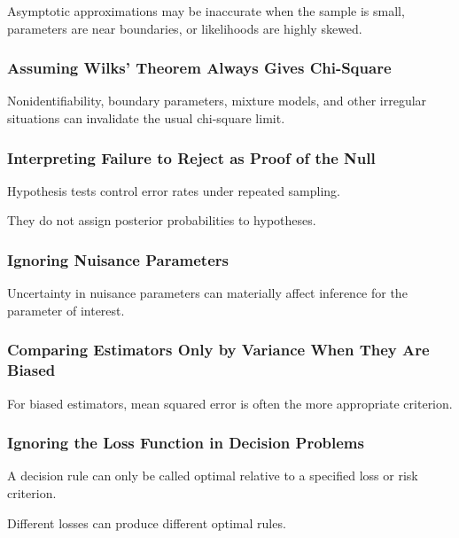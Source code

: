 Asymptotic approximations may be inaccurate when the sample is small,
parameters are near boundaries, or likelihoods are highly skewed.

\subsubsection{Assuming Wilks' Theorem Always Gives Chi-Square}

Nonidentifiability, boundary parameters, mixture models, and other
irregular situations can invalidate the usual chi-square limit.

\subsubsection{Interpreting Failure to Reject as Proof of the Null}

Hypothesis tests control error rates under repeated sampling.

They do not assign posterior probabilities to hypotheses.

\subsubsection{Ignoring Nuisance Parameters}

Uncertainty in nuisance parameters can materially affect inference for
the parameter of interest.

\subsubsection{Comparing Estimators Only by Variance When They Are Biased}

For biased estimators, mean squared error is often the more appropriate
criterion.

\subsubsection{Ignoring the Loss Function in Decision Problems}

A decision rule can only be called optimal relative to a specified loss or
risk criterion.

Different losses can produce different optimal rules.

